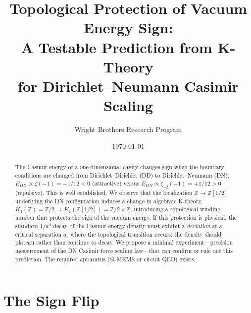 \documentclass[aps,prl,twocolumn,superscriptaddress,nofootinbib]{revtex4-2}
\begin{document}
\title{Topological Protection of Vacuum Energy Sign:\\
A Testable Prediction from K-Theory\\
for Dirichlet--Neumann Casimir Scaling}

\author{Wright Brothers Research Program}

\date{\today}

\begin{abstract}
The Casimir energy of a one-dimensional cavity changes sign when the
boundary conditions are changed from Dirichlet--Dirichlet (DD) to
Dirichlet--Neumann (DN): $E_{DD}\propto\zeta(-1)=-1/12<0$ (attractive)
versus $E_{DN}\propto\zeta_{\neg 2}(-1)=+1/12>0$ (repulsive).  This is
well established.  We observe that the localization
$\mathbb{Z}\to\mathbb{Z}[1/2]$ underlying the DN configuration
induces a change in algebraic K-theory,
$K_1(\mathbb{Z})=\mathbb{Z}/2\to K_1(\mathbb{Z}[1/2])=
\mathbb{Z}/2\times\mathbb{Z}$, introducing a topological
winding number that protects the sign of the vacuum energy.
If this protection is physical, the standard $1/a^4$ decay of
the Casimir energy density must exhibit a \emph{deviation} at a
critical separation $a_c$ where the topological transition occurs:
the density should plateau rather than continue to decay.  We
propose a minimal experiment---precision measurement of the
DN Casimir force scaling law---that can confirm or rule out this
prediction.  The required apparatus (Si-MEMS or circuit QED) exists.
\end{abstract}

\maketitle

\section{The Sign Flip}
\end{document}
